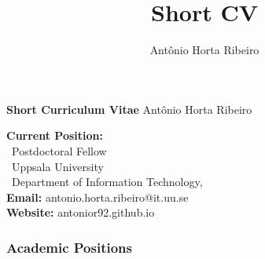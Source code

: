 \documentclass[10pt,letterpaper]{article} %
\title{Short CV}
\author{Ant\^onio Horta Ribeiro}
\begin{document}
\thispagestyle{empty}
{\Large \textbf{Short Curriculum Vitae} \hfill {\sc  Ant\^onio Horta Ribeiro}}

    \vspace{10pt}
\begin{multicols}{2}
    \small
    \textbf{Current Position:}\\
    \, Postdoctoral Fellow\\
    \, Uppsala University \\
    \, Department of Information Technology,\\
    {\bf Email:} antonio.horta.ribeiro@it.uu.se\\
    {\bf Website:} antonior92.github.io
\end{multicols}

\subsubsection*{Academic Positions} %
\end{document}
